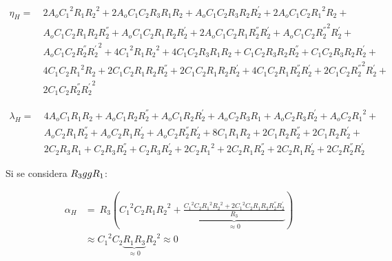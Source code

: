 \documentclass[a4paper]{article}
\begin{document}
\begin{equation*}
\begin{split}
	\eta_H =\ & 2 A_{o} {C_{1}}^{2} R_{1} {R_{2}}^{2} + 2 A_{o} C_{1} C_{2} R_{3} R_{1} R_{2} + A_{o} C_{1} C_{2} R_{3} R_{2} R_{2}^{'} + 2 A_{o} C_{1} C_{2} {R_{1}}^{2} R_{2} +\\
	&A_{o} C_{1} C_{2} R_{1} R_{2} R_{2}^{''} + A_{o} C_{1} C_{2} R_{1} R_{2} R_{2}^{'} + 2 A_{o} C_{1} C_{2} R_{1} R_{2}^{''} R_{2}^{'} + A_{o} C_{1} C_{2} {R_{2}^{''}}^{2} R_{2}^{'} +\\
	&A_{o} C_{1} C_{2} R_{2}^{''} {R_{2}^{'}}^{2} + 4 {C_{1}}^{2} R_{1} {R_{2}}^{2} + 4 C_{1} C_{2} R_{3} R_{1} R_{2} + C_{1} C_{2} R_{3} R_{2} R_{2}^{''} + C_{1} C_{2} R_{3} R_{2} R_{2}^{'} +\\
	&4 C_{1} C_{2} {R_{1}}^{2} R_{2} + 2 C_{1} C_{2} R_{1} R_{2} R_{2}^{''} + 2 C_{1} C_{2} R_{1} R_{2} R_{2}^{'} + 4 C_{1} C_{2} R_{1} R_{2}^{''} R_{2}^{'} + 2 C_{1} C_{2} {R_{2}^{''}}^{2} R_{2}^{'} + \\
	&2 C_{1} C_{2} R_{2}^{''} {R_{2}^{'}}^{2}
\end{split}
\end{equation*}

\begin{equation*}
\begin{split}
	\lambda_H =\ & 4 A_{o} C_{1} R_{1} R_{2} + A_{o} C_{1} R_{2} R_{2}^{''} + A_{o} C_{1} R_{2} R_{2}^{'} + A_{o} C_{2} R_{3} R_{1} + A_{o} C_{2} R_{3} R_{2}^{'} + A_{o} C_{2} {R_{1}}^{2} +\\
	&A_{o} C_{2} R_{1} R_{2}^{''} + A_{o} C_{2} R_{1} R_{2}^{'} + A_{o} C_{2} R_{2}^{''} R_{2}^{'} + 8 C_{1} R_{1} R_{2} + 2 C_{1} R_{2} R_{2}^{''} + 2 C_{1} R_{2} R_{2}^{'} +\\
	&2 C_{2} R_{3} R_{1} + C_{2} R_{3} R_{2}^{''} + C_{2} R_{3} R_{2}^{'} + 2 C_{2} {R_{1}}^{2} + 2 C_{2} R_{1} R_{2}^{''} + 2 C_{2} R_{1} R_{2}^{'} + 2 C_{2} R_{2}^{''} R_{2}^{'}
\end{split}
\end{equation*}

Si se considera $R_3 \\gg R_1$:

\begin{equation*}
\begin{split}
	\alpha_H & =\  R_3 \left( {C_{1}}^{2} C_{2} R_{1} {R_{2}}^{2} + \underbrace{\frac{{C_{1}}^{2} C_{2} {R_{1}}^{2} {R_{2}}^{2} + 2 {C_{1}}^{2} C_{2} R_{1} R_{2} R_{2}^{''} R_{2}^{'}}{R_3}}_{\approx 0} \right) \\
	& \approx {C_{1}}^{2} C_{2} \underbrace{R_{1} R_3}_{\approx 0} {R_{2}}^{2} \approx 0
\end{split}
\end{equation*}
\end{document}
